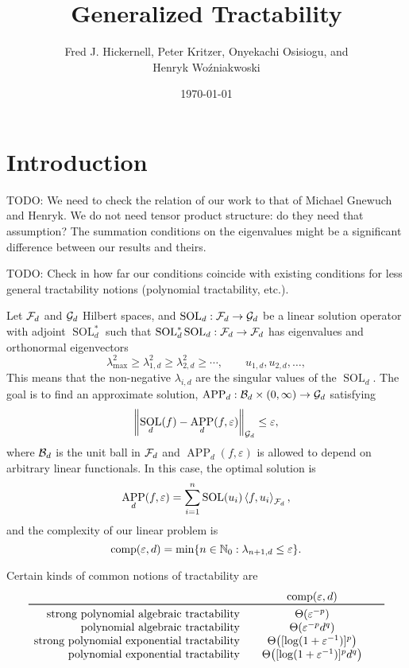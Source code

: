 \documentclass[11pt,a4paper]{article}
\DeclareMathOperator{\SOL}{SOL}
\DeclareMathOperator{\APP}{APP}
\newcommand{\fred}[1]{\begingroup\color{blue}#1\endgroup}
\newcommand{\peter}[1]{\begingroup\color{purple}#1\endgroup}
\newcommand{\kachi}[1]{\begingroup\color{ForestGreen}#1\endgroup}
\begin{document}
\newtheorem{theorem}{Theorem}
\theoremstyle{definition}
\newtheorem{definition}{Definition}


\title{Generalized Tractability}
\author{\fred{Fred J. Hickernell}, \peter{Peter Kritzer}, \kachi{Onyekachi Osisiogu}, and \\ Henryk Wo\'zniakwoski}
\date{\today}

\maketitle

\section{Introduction}

TODO: We need to check the relation of our work to that of Michael Gnewuch and Henryk. We do not need tensor product structure: do they need that assumption? The summation conditions on the eigenvalues might be a significant difference between our results and theirs.

\medskip

TODO: Check in how far our conditions coincide with existing conditions for less general tractability notions (polynomial tractability, etc.).

\medskip

Let $\mathcal{F}_d$ and $\mathcal{G}_d$ Hilbert spaces, and $\SOL_d : \cf_d \to \cg_d$ be a linear solution operator with adjoint $\SOL_d^*$ such that $\SOL_d^*\SOL_d : \cf_d \to \cf_d$ has eigenvalues and orthonormal eigenvectors  
\[
\lambda_{\max}^2 \ge \lambda_{1,d}^2 \ge \lambda_{2,d}^2 \ge \cdots, \qquad u_{1,d}, u_{2,d}, \ldots, 
\]
This means that the non-negative $\lambda_{i,d}$ are the singular values of the $\SOL_d$. The goal is to find an approximate solution, $\APP_d:\cb_d \times (0,\infty) \to \cg_d$ satisfying 
\[
\norm[\cg_d]{\SOL_d(f) - \APP_d(f,\varepsilon)} \le \varepsilon,
\]
where $\mathcal{B}_d$ is the unit ball in $\mathcal{F}_d$ and $\APP_d(f,\varepsilon)$ is allowed to depend on arbitrary linear functionals.  In this case, the optimal solution is 
\[
\APP_d(f,\varepsilon) = \sum_{i=1}^n \SOL(u_i) \ip[\cf_d]{f}{u_i},
\]
and the complexity of our linear problem is
\[
\operatorname{comp}(\varepsilon, d) = \min \{n \in \mathbb{N}_{0} : \lambda_{n+1, d} \le \varepsilon\}.
\]

Certain kinds of common notions of tractability are 
\begin{equation*}
    \begin{array}{r@{\qquad}c@{\qquad}c}
    & \comp(\varepsilon, d)\\
    \toprule
    \text{strong polynomial algebraic  tractability} & \Theta(\varepsilon^{-p})\\
    \text{polynomial algebraic tractability} & \Theta(\varepsilon^{-p}d^{q})\\
    \text{strong polynomial exponential tractability} &  \Theta\bigl([\log(1 + \varepsilon^{-1})]^p\bigr)\\
    \text{polynomial exponential tractability} & \Theta\bigl([\log(1 + \varepsilon^{-1})]^p  d^{q}\bigr)
    \end{array}
\end{equation*}
\end{document}
